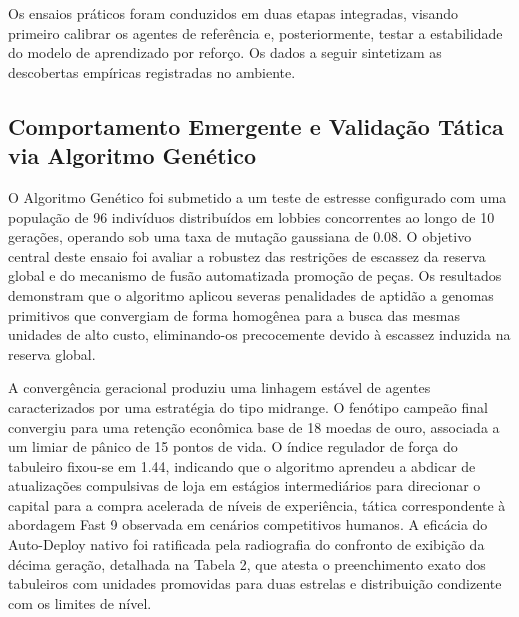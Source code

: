 \documentclass[12pt]{article}
\begin{document}
Os ensaios práticos foram conduzidos em duas etapas integradas, visando primeiro calibrar os agentes de referência e, posteriormente, testar a estabilidade do modelo de aprendizado por reforço. Os dados a seguir sintetizam as descobertas empíricas registradas no ambiente.

\subsection{Comportamento Emergente e Validação Tática via Algoritmo Genético}
O Algoritmo Genético foi submetido a um teste de estresse configurado com uma população de 96 indivíduos distribuídos em lobbies concorrentes ao longo de 10 gerações, operando sob uma taxa de mutação gaussiana de 0.08. O objetivo central deste ensaio foi avaliar a robustez das restrições de escassez da reserva global e do mecanismo de fusão automatizada promoção de peças. Os resultados demonstram que o algoritmo aplicou severas penalidades de aptidão a genomas primitivos que convergiam de forma homogênea para a busca das mesmas unidades de alto custo, eliminando-os precocemente devido à escassez induzida na reserva global.

A convergência geracional produziu uma linhagem estável de agentes caracterizados por uma estratégia do tipo midrange. O fenótipo campeão final convergiu para uma retenção econômica base de 18 moedas de ouro, associada a um limiar de pânico de 15 pontos de vida. O índice regulador de força do tabuleiro fixou-se em 1.44, indicando que o algoritmo aprendeu a abdicar de atualizações compulsivas de loja em estágios intermediários para direcionar o capital para a compra acelerada de níveis de experiência, tática correspondente à abordagem Fast 9 observada em cenários competitivos humanos. A eficácia do Auto-Deploy nativo foi ratificada pela radiografia do confronto de exibição da décima geração, detalhada na Tabela 2, que atesta o preenchimento exato dos tabuleiros com unidades promovidas para duas estrelas e distribuição condizente com os limites de nível.
\end{document}
